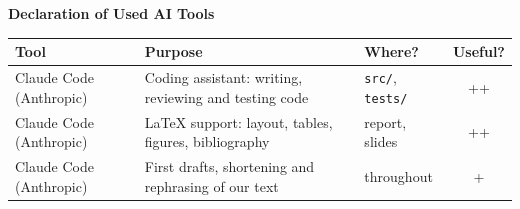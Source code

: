 \documentclass[a4paper,oneside,bibliography=totoc]{scrbook}
\begin{document}
\frontmatter
{}
\subject{IE500 Data Mining -- Project Report}
\title{\ProjectTitle}
\subtitle{\ProjectSubtitle}
\author{Team \TeamNumber\\[.3em] \TeamMembers}
\date{\SubmissionDate}
\publishers{{\small Submitted to}\\
  Data and Web Science Group\\
  University of Mannheim\\}
\maketitle

\begingroup%
\hypersetup{hidelinks}%
\setcounter{tocdepth}{0}%
\begin{multicols}{2}[\section*{\contentsname}]%
\tableofcontents%
\end{multicols}%
\endgroup

\begin{center}
  \textbf{Declaration of Used AI Tools} \\[.3em]
  \footnotesize
  \begin{tabularx}{\textwidth}{@{}lXlc@{}}
    \toprule
    Tool & Purpose & Where? & Useful? \\
    \midrule
    Claude Code (Anthropic) & Coding assistant: writing, reviewing and testing code & \texttt{src/}, \texttt{tests/} & ++ \\
    Claude Code (Anthropic) & LaTeX support: layout, tables, figures, bibliography & report, slides & ++ \\
    Claude Code (Anthropic) & First drafts, shortening and rephrasing of our text & throughout & + \\
    \bottomrule
  \end{tabularx}
\end{center}
\end{document}
